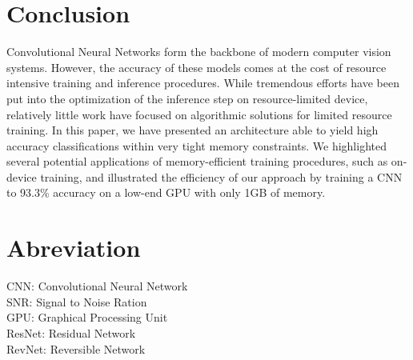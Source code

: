 \documentclass[twocolumn]{bmcart}
\begin{document}
\section{Conclusion}

Convolutional Neural Networks form the backbone of modern computer vision systems.
However, the accuracy of these models comes at the cost of resource intensive training and inference procedures.
While tremendous efforts have been put into the optimization of the inference step on resource-limited device,
relatively little work have focused on algorithmic solutions for limited resource training. 
In this paper, we have presented an architecture able to yield high accuracy classifications within very tight memory constraints.
We highlighted several potential applications of memory-efficient training procedures, such as on-device training,
and illustrated the efficiency of our approach by training a CNN to 93.3\% accuracy on a low-end GPU with only 1GB of memory.

\section*{Abreviation}

CNN: Convolutional Neural Network  \\
SNR: Signal to Noise Ration \\
GPU: Graphical Processing Unit \\
ResNet: Residual Network \\
RevNet: Reversible Network
\end{document}
